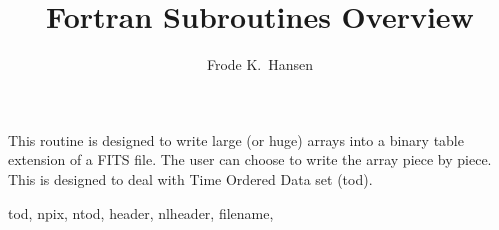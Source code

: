 
\sloppy


\title{\healpix Fortran Subroutines Overview}
 \section[write\_bintabh]{ }
\label{sub:write_bintabh}
\author{Frode K.~Hansen}

\begin{facility}
{This routine is designed to write large (or huge) arrays into a binary table
extension of a FITS file. The user can
choose to write the array piece by piece. This is designed to deal with Time
Ordered Data set (tod).}
{\modFitstools}
\end{facility}

\begin{f90format}
{tod, npix, ntod, header, nlheader, filename, }
\end{f90format}
\aboutoptional

